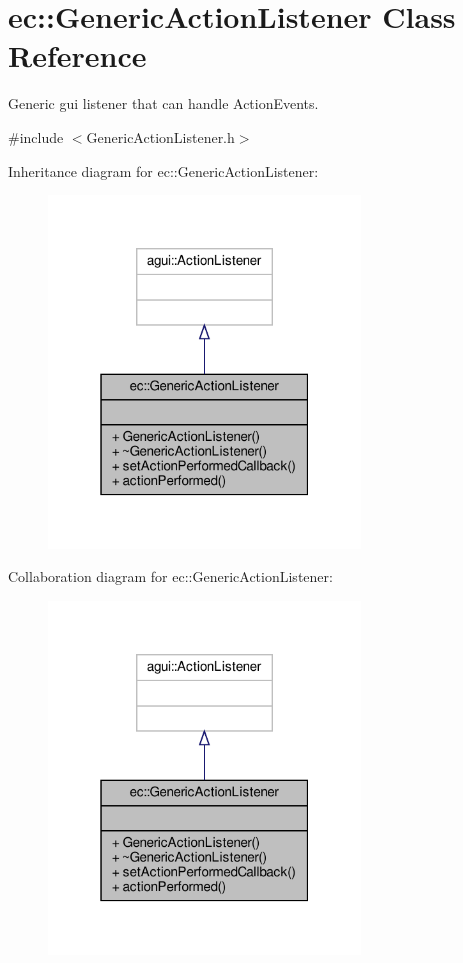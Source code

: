 \hypertarget{classec_1_1_generic_action_listener}{}\section{ec\+:\+:Generic\+Action\+Listener Class Reference}
\label{classec_1_1_generic_action_listener}


Generic gui listener that can handle Action\+Events.  




{\ttfamily \#include $<$Generic\+Action\+Listener.\+h$>$}



Inheritance diagram for ec\+:\+:Generic\+Action\+Listener\+:\nopagebreak
\begin{figure}[H]
\begin{center}
\leavevmode
\includegraphics[width=235pt]{classec_1_1_generic_action_listener__inherit__graph}
\end{center}
\end{figure}


Collaboration diagram for ec\+:\+:Generic\+Action\+Listener\+:\nopagebreak
\begin{figure}[H]
\begin{center}
\leavevmode
\includegraphics[width=235pt]{classec_1_1_generic_action_listener__coll__graph}
\end{center}
\end{figure}
